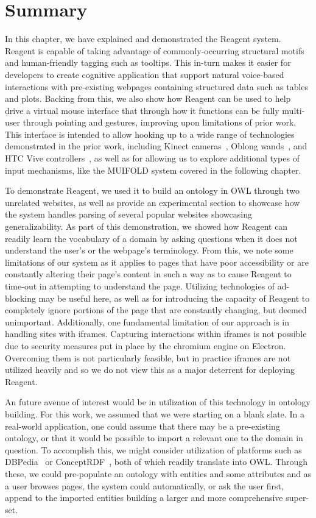 \section{Summary}

In this chapter, we have explained and demonstrated the Reagent system. Reagent
is capable of taking advantage of commonly-occurring structural motifs and
human-friendly tagging such as tooltips. This in-turn makes it easier for
developers to create cognitive application that support natural voice-based
interactions with pre-existing webpages containing structured data such as tables
and plots. Backing from this, we also show how Reagent can be used to help
drive a virtual mouse interface that through how it functions can be fully multi-user
through pointing and gestures, improving upon limitations of prior work. This interface
is intended to allow hooking up to a wide range of technologies demonstrated in
the prior work, including Kinect cameras~\cite{allen_rensselaer_2019},
Oblong wands~\cite{kephart_embodied_2019}, and HTC Vive controllers~\cite{zhao_immersive_2018},
as well as for allowing us to explore additional types of input mechanisms, like the
MUIFOLD system covered in the following chapter.

To demonstrate Reagent, we used it to build an ontology in OWL through two unrelated websites,
as well as provide an experimental section to showcase how the system handles
parsing of several popular websites showcasing generalizability. As part of this demonstration,
we showed how Reagent can readily learn the vocabulary of a domain by asking questions when it
does not understand the user's or the webpage's terminology. From this, we note some limitations
of our system as it applies to pages that have poor accessibility or are constantly altering
their page's content in such a way as to cause Reagent to time-out in attempting to understand
the page. Utilizing technologies of ad-blocking may be useful here, as well as for
introducing the capacity of Reagent to completely ignore portions of the page that are constantly
changing, but deemed unimportant. Additionally, one fundamental limitation of our approach is
in handling sites with iframes. Capturing interactions within iframes is not possible due to
security measures put in place by the chromium engine on Electron. Overcoming them is not
particularly feasible, but in practice iframes are not utilized heavily and so we do not view
this as a major deterrent for deploying Reagent.

An future avenue of interest would be in utilization of this technology in ontology building.
For this work, we assumed that we were starting on a blank slate. In a real-world application,
one could assume that there may be a pre-existing ontology, or that it would be possible to
import a relevant one to the domain in question. To accomplish this, we might consider utilization
of platforms such as DBPedia~\cite{auer_dbpedia_2007} or ConceptRDF~\cite{najmi_conceptrdf_2016}, both
of which readily translate into OWL. Through these, we could pre-populate an ontology with
entities and some attributes and as a user browses pages, the system could automatically, or
ask the user first, append to the imported entities building a larger and more comprehensive super-set.